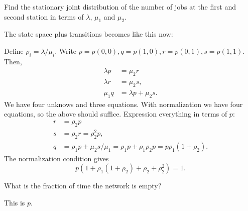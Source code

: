 \begin{exercise}[201706]
  Find the stationary joint distribution of the number of jobs at the first
  and second station in terms of $\lambda$, $\mu_1$ and $\mu_2$.
\begin{solution}
The state space plus transitions becomes like this now:



Define $\rho_i=\lambda/\mu_i$. Write $p=p(0,0), q=p(1,0), r=p(0,1), s=p(1,1)$. Then,
  \begin{align*}
     \lambda p &= \mu_2 r \\
     \lambda r &= \mu_2 s,\\
     \mu_1 q &= \lambda p + \mu_2 s.
  \end{align*}
We have four unknows and three equations. With normalization we have four equations, so the above should  suffice.  Expression everything in terms of $p$: 
  \begin{align*}
     r &= \rho_2 p \\
     s &= \rho_2 r = \rho_2^2 p,\\
     q &= \rho_1 p + \mu_2 s/\mu_1 = \rho_1 p + \rho_1\rho_2 p = p \rho_1 (1+\rho_2).
  \end{align*}
The normalization condition gives
\begin{equation*}
  p(1+\rho_1(1+\rho_2) + \rho_2 + \rho_2^2) = 1.
\end{equation*}

\end{solution}
\end{exercise}

\begin{exercise}[201706]
What is the fraction of time the network is empty? %
\begin{solution}
This is $p$. 
\end{solution}
\end{exercise}

